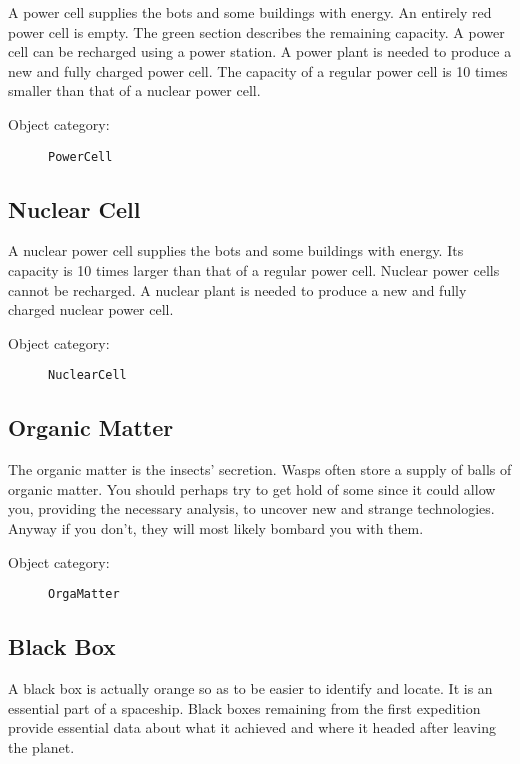 A power cell supplies the bots and some buildings with energy. An entirely red power cell is empty. The green section describes the remaining capacity. A power cell can be recharged using a power station. A power plant is needed to produce a new and fully charged power cell. The capacity of a regular power cell is 10 times smaller than that of a nuclear power cell.

\begin{description}
    \item[Object category:] \texttt{PowerCell}
\end{description}


\subsection{Nuclear Cell}

A nuclear power cell supplies the bots and some buildings with energy. Its capacity is 10 times larger than that of a regular power cell. Nuclear power cells cannot be recharged. A nuclear plant is needed to produce a new and fully charged nuclear power cell.

\begin{description}
    \item[Object category:] \texttt{NuclearCell}
\end{description}


\subsection{Organic Matter}

The organic matter is the insects' secretion. Wasps often store a supply of balls of organic matter. You should perhaps try to get hold of some since it could allow you, providing the necessary analysis, to uncover new and strange technologies. Anyway if you don't, they will most likely bombard you with them.

\begin{description}
    \item[Object category:] \texttt{OrgaMatter}
\end{description}


\subsection{Black Box}

A black box is actually orange so as to be easier to identify and locate. It is an essential part of a spaceship. Black boxes remaining from the first expedition provide essential data about what it achieved and where it headed after leaving the planet.

